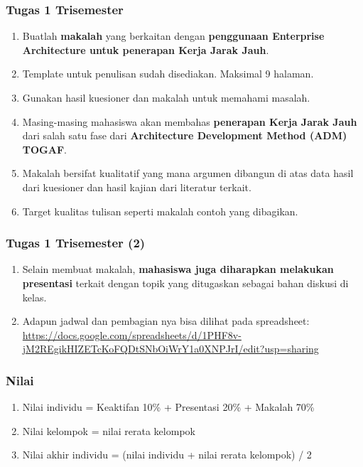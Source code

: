 \documentclass[aspectratio=169, table]{beamer}
\begin{document}
	\begin{frame}
		\frametitle{Tugas 1 Trisemester}
		\begin{enumerate}
			\item Buatlah \textbf{makalah} yang berkaitan dengan \textbf{penggunaan Enterprise Architecture untuk penerapan Kerja Jarak Jauh}.
			\item Template untuk penulisan sudah disediakan. Maksimal 9 halaman.
			\item Gunakan hasil kuesioner dan makalah untuk memahami masalah.
			\item Masing-masing mahasiswa akan membahas \textbf{penerapan Kerja Jarak Jauh} dari salah satu fase dari \textbf{Architecture Development Method (ADM) TOGAF}.
			\item Makalah bersifat kualitatif yang mana argumen dibangun di atas data hasil dari kuesioner dan hasil kajian dari literatur terkait.
			\item Target kualitas tulisan seperti makalah contoh yang dibagikan.
		\end{enumerate}
	\end{frame}

	\begin{frame}
		\frametitle{Tugas 1 Trisemester (2)}
		\begin{enumerate}
			\item Selain membuat makalah, \textbf{mahasiswa juga diharapkan melakukan presentasi} terkait dengan topik yang ditugaskan sebagai bahan diskusi di kelas.
			\item Adapun jadwal dan pembagian nya bisa dilihat pada spreadsheet:  \url{https://docs.google.com/spreadsheets/d/1PHF8v-jM2REgikHIZETcKoFQDtSNbOiWrY1a0XNPJrI/edit?usp=sharing}
		\end{enumerate}
	\end{frame}

	\begin{frame}
		\frametitle{Nilai}
		\begin{enumerate}
			\item Nilai individu = Keaktifan 10\% + Presentasi 20\% + Makalah 70\%
			\item Nilai kelompok = nilai rerata kelompok
			\item Nilai akhir individu = (nilai individu + nilai rerata kelompok) / 2
		\end{enumerate}
	\end{frame}
\end{document}
